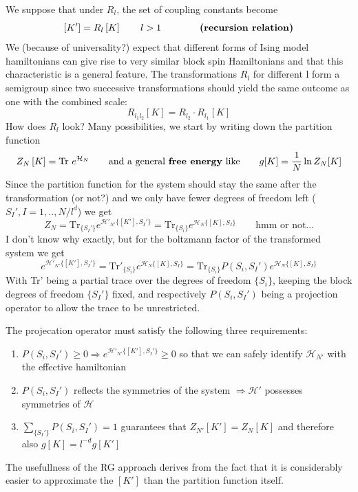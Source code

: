 	We suppose that under $R_l$, the set of coupling constants become
	\begin{equation}
		\left[K'\right] =	R_l\left[K \right] \qquad l > 1 \qquad \qquad \text{\textbf{(recursion relation)}}
	\end{equation}
	We (because of universality?) expect that different forms of Ising model hamiltonians can give rise to very similar block spin Hamiltonians and that this characteristic is a general feature. The transformations $R_l$ for different l form a semigroup since two successive transformations should yield the same outcome as one with the combined scale:
	\begin{equation}
		R_{l_1 l_2} \left[K\right] = R_{l_2} \cdot R_{l_1}\left[K\right]
	\end{equation}
	How does $R_l$ look? Many possibilities, we start by writing down the partition function
	\begin{equation}
		Z_N\left[K\right] =	\text{Tr}~e^{\mathcal{H}_N} \qquad \text{and a general \textbf{free energy} like} \qquad g[K] =	\frac{1}{N} \ln Z_N[K]
	\end{equation}
	Since the partition function for the system should stay the same after the transformation (or not?) and we only have fewer degrees of freedom left ($S_I', I= 1, .., N/l^d$) we get
	\begin{equation}
		Z_N =	\text{Tr}_{\lbrace S_I' \rbrace} e^{\mathcal{H'}_{N'} \lbrace [K'], S_I' \rbrace} =	\text{Tr}_{\lbrace S_i \rbrace} e^{\mathcal{H}_{N} \lbrace [K], S_I \rbrace} \qquad \text{hmm or not...}
	\end{equation}
	I don't know why exactly, but for the boltzmann factor of the transformed system we get
	\begin{equation}
		e^{\mathcal{H'}_{N'} \lbrace [K'], S_I' \rbrace} =	\text{Tr}'_{\lbrace S_i \rbrace} e^{\mathcal{H}_{N} \lbrace [K], S_I \rbrace} =	\text{Tr}_{\lbrace S_i \rbrace} P(S_i, S_I') e^{\mathcal{H}_{N} \lbrace [K], S_I \rbrace}
	\end{equation}
	With Tr'	being a partial trace over the degrees of freedom $\lbrace S_i \rbrace$, keeping the block degrees of freedom $\lbrace S_I' \rbrace $ fixed, and respectively $P(S_i, S_I')$ being a projection operator to allow the trace to be unrestricted.
	
	The projecation operator must satisfy the following three requirements:
	\begin{enumerate}
		\item $P(S_i, S_I') \geq 0 \Rightarrow e^{\mathcal{H'}_{N'} \lbrace [K'], S_I' \rbrace} \geq 0$ so that we can safely identify $\mathcal{H}_{N'}$ with the effective hamiltonian
		\item $P(S_i, S_I')$ reflects the symmetries of the system $\Rightarrow  \mathcal{H'}$ possesses symmetries of $\mathcal{H}$
		\item $\sum_{\lbrace S_I' \rbrace}^{} P(S_i, S_I') =	1$  guarantees that $Z_{N'}[K'] =	Z_N[K]$ and therefore also $g[K] =	l^{-d}g[K']$
	\end{enumerate}
	The usefullness of the RG approach derives from the fact that it is considerably easier to approximate the $[K']$ than the partition function itself.
	
